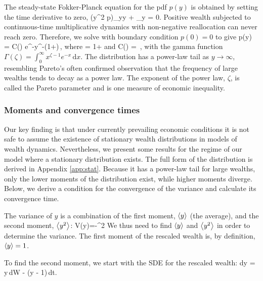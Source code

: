 The steady-state Fokker-Planck equation for the pdf $p\left(y\right)$ is obtained by setting the time derivative to zero,
\be
{}\left(y^2 p\right)_{yy} + \tau{}_y = 0.
\ee
Positive wealth subjected to continuous-time multiplicative dynamics with non-negative reallocation can never reach zero. Therefore, we solve  with boundary condition $p\left(0\right)=0$ to give
\be
p\left(y\right) = C\left(\zeta\right) e^{-}y^{-\left(1+\zeta\right)}\,,
\ee
where 
\be
\zeta = 1+
\ee
and
\be
C\left(\zeta\right) = \frac{\left(\zeta -1\right)^\zeta}{\Gamma \left(\zeta \right)}\,,
\ee
with the gamma function $\Gamma\left(\zeta\right) = \int_0^\infty x^{\zeta-1} e^{-x}\,\mathrm{d}x$. The distribution has a power-law tail as $y\to\infty$, resembling Pareto's often confirmed observation that the frequency of large wealths tends to decay as a power law. The exponent of the power law, $\zeta$, is called the Pareto parameter and is one measure of economic inequality.


\subsubsection{Moments and convergence times}
\label{RGBM_moments}

Our key finding is that under currently prevailing economic conditions it is not safe to assume the existence of stationary wealth distributions in models of wealth dynamics. 
Nevertheless, we present some results for the regime of our model where a stationary distribution exists.
The full form of the distribution is derived in Appendix \ref{app:stat}. Because it has a power-law tail for large wealths, only the lower moments of the distribution exist, while higher moments diverge.
Below, we derive a condition for the convergence of the variance and calculate its convergence time.

The variance of $y$ is a combination of the first moment, $\left\langle y \right\rangle$ (the average), and the second moment, $\left\langle y^2 \right\rangle$:
\be
V\left(y\right)=-^2
\ee
We thus need to find $\left\langle y \right\rangle$ and $\left\langle y^2 \right\rangle$ in order to determine the variance. 
The first moment of the rescaled wealth is, by definition, $\left\langle y \right\rangle=1$. 

To find the second moment, we start with the SDE for the rescaled wealth:
\be
dy = \sigma y\,dW - \tau\left(y - 1\right)\,dt.
\ee

